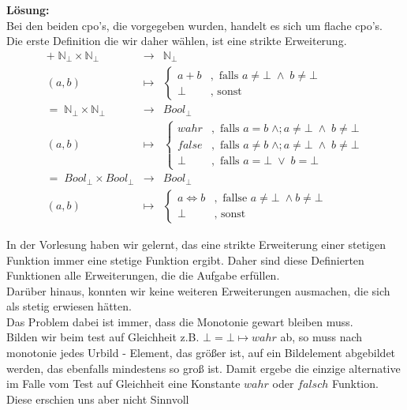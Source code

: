 \documentclass[11pt,a4paper,ngerman]{article}
\begin{document}
\textbf{Lösung:}\\
Bei den beiden cpo's, die vorgegeben wurden, handelt es sich um flache cpo's.\\

Die erste Definition die wir daher wählen, ist eine strikte Erweiterung.
$$\begin{array}{rcl}
	+ \; \mathbb{N}_\bot \times \mathbb{N}_\bot & \longrightarrow & \mathbb{N}_\bot\\
		(a,b) &\mapsto & \left\{\begin{array}{lr}
			a+b &, \text{ falls } a\not= \bot \; \land \; b \not=\bot\\
			\bot &, \text{ sonst }
		\end{array}\right.\\
	= \; \mathbb{N}_\bot \times \mathbb{N}_\bot &\longrightarrow& Bool_\bot\\
		(a,b) &\mapsto & \left\{\begin{array}{lr}
			wahr &, \text{ falls } a = b \; \land ;a \not= \bot \; \land \; b \not= \bot\\
			false &, \text{ falls } a \not= b \; \land ;a \not= \bot \; \land \; b \not= \bot\\
			\bot &, \text{ falls } a = \bot \; \lor \; b = \bot
		\end{array}\right. \\
	= \; Bool_\bot \times Bool_\bot & \longrightarrow & Bool_\bot\\
		(a,b) &\mapsto & \left\{ \begin{array}{lr}
			a \Leftrightarrow b &, \text{ fallse } a\not= \bot \; \land b \not= \bot\\
			\bot &, \text{ sonst}
		\end{array} \right.
\end{array}$$

In der Vorlesung haben wir gelernt, das eine strikte Erweiterung einer stetigen Funktion immer eine stetige Funktion ergibt. Daher sind diese Definierten Funktionen alle Erweiterungen, die die Aufgabe erfüllen.\\

Darüber hinaus, konnten wir keine weiteren Erweiterungen ausmachen, die sich als stetig erwiesen hätten.\\
Das Problem dabei ist immer, dass die Monotonie gewart bleiben muss.\\


Bilden wir beim test auf Gleichheit z.B. $\bot = \bot \mapsto wahr$ ab, so muss nach monotonie jedes Urbild - Element, das größer ist,
auf ein Bildelement abgebildet werden, das ebenfalls mindestens so groß ist. Damit ergebe die einzige alternative im Falle vom Test auf Gleichheit
eine Konstante $wahr$ oder $falsch$ Funktion.\\
Diese erschien uns aber nicht Sinnvoll\\
\end{document}
